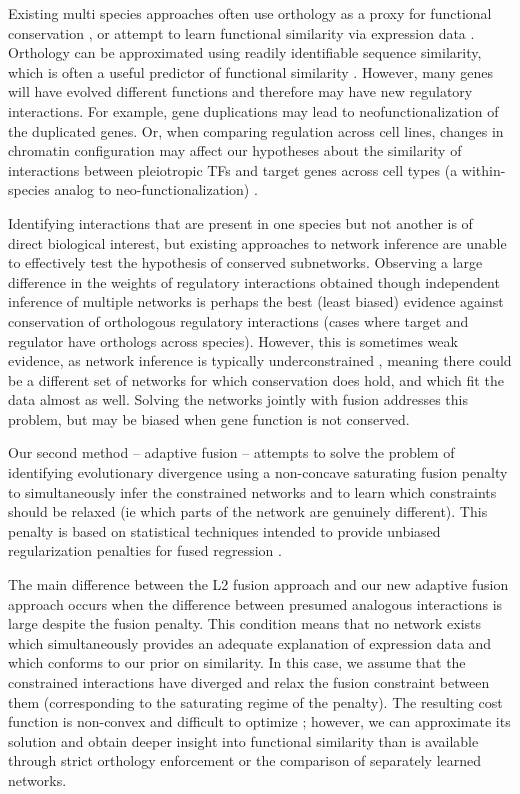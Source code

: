 \documentclass[11pt]{article}
\begin{document}
Existing multi species approaches often use orthology as a proxy for functional conservation \cite{roy_arboretum:_2013, penfold_inferring_2015, joshi_multi-species_2015, kashima_simultaneous_2009, zhang2010nearly}, or attempt to learn functional similarity via expression data \cite{gholami_cross-species_2010}. 
Orthology can be approximated using readily identifiable sequence similarity, which is often a useful predictor of functional similarity \cite{wilson_assessing_2000, jensen_eggnog:_2008}. However, many genes will have evolved different functions and therefore may have new regulatory interactions. For example, gene duplications may lead to neofunctionalization \cite{eisen_phylogenomics:_1998} of the duplicated genes. Or, when comparing regulation across cell lines, changes in chromatin configuration may affect our hypotheses about the similarity of interactions between pleiotropic TFs and target genes across cell types (a within-species analog to neo-functionalization) \cite{li_role_2007}. 

Identifying interactions that are present in one species but not another is of direct biological interest, but existing approaches to network inference are unable to effectively test the hypothesis of conserved subnetworks. Observing a large difference in the weights of regulatory interactions obtained though independent inference of multiple networks is perhaps the best (least biased) evidence against conservation of orthologous regulatory interactions (cases where target and regulator have orthologs across species). However, this is sometimes weak evidence, as network inference is typically underconstrained \cite{marbach_revealing_2010}, meaning there could be a different set of networks for which conservation does hold, and which fit the data almost as well. Solving the networks jointly with fusion addresses this problem, but may be biased when gene function is not conserved. 

Our second method -- adaptive fusion -- attempts to solve the problem of identifying evolutionary divergence using a non-concave saturating fusion penalty to simultaneously infer the constrained networks and to learn which constraints should be relaxed (ie which parts of the network are genuinely different). This penalty is based on statistical techniques intended to provide unbiased regularization penalties for fused regression \cite{zhang2010nearly, fan2001variable}.

The main difference between the L2 fusion approach and our new adaptive fusion approach occurs when the difference between presumed analogous interactions is large despite the fusion penalty. This condition means that no network exists which simultaneously provides an adequate explanation of expression data and which conforms to our prior on similarity. In this case, we assume that the constrained interactions have diverged and relax the fusion constraint between them (corresponding to the saturating regime of the penalty). The resulting cost function is non-convex and difficult to optimize \cite{fan2001variable}; however, we can approximate its solution and obtain deeper insight into functional similarity than is available through strict orthology enforcement or the comparison of separately learned networks. 
\end{document}
